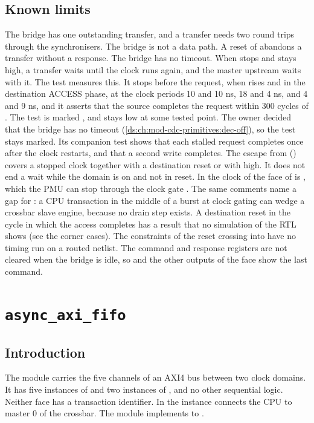 \subsection{Known limits}
The bridge has one outstanding transfer, and a transfer needs two round trips through the synchronisers. The bridge is not a data path. A reset of  abandons a transfer without a response. The bridge has no timeout. When  stops and  stays high, a transfer waits until the clock runs again, and the master upstream waits with it. The test  measures this. It stops  before the request, when  rises and in the destination ACCESS phase, at the clock periods 10 and 10 ns, 18 and 4 ns, and 4 and 9 ns, and it asserts that the source completes the request within 300 cycles of . The test is marked , and  stays low at some tested point. The owner decided that the bridge has no timeout (\cref{ds:ch:mod-cdc-primitives:dec-off}), so the test stays marked. Its companion test shows that each stalled request completes once after the clock restarts, and that a second write completes. The escape from  () covers a stopped clock together with a destination reset or with  high. It does not end a wait while the domain is on and not in reset. In  the clock of the  face of  is , which the PMU can stop through the clock gate . The same  comments name a gap for : a CPU transaction in the middle of a burst at clock gating can wedge a crossbar slave engine, because no drain step exists. A destination reset in the cycle in which the access completes has a result that no simulation of the RTL shows (see the corner cases). The constraints of the reset crossing into  have no timing run on a routed netlist. The command and response registers are not cleared when the bridge is idle, so  and the other outputs of the  face show the last command.

\section{\texttt{async\_axi\_fifo}}\label{tm:mod:async-axi-fifo}

\subsection{Introduction}
The module  carries the five channels of an AXI4 bus between two clock domains. It has five instances of  and two instances of , and no other sequential logic. Neither face has a transaction identifier. In  the instance  connects the CPU to master 0 of the crossbar. The module implements  to .

